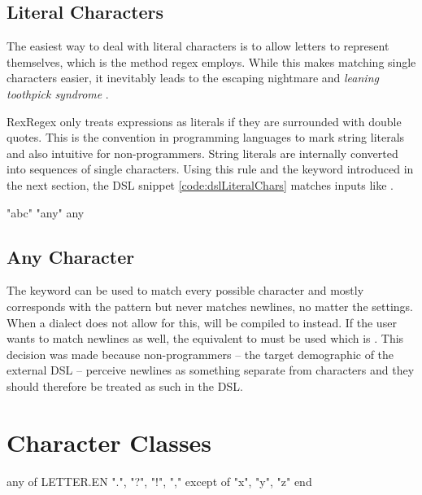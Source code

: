\subsection{Literal Characters}

The easiest way to deal with literal characters is to allow letters to represent themselves, which is the method regex employs. While this makes matching single characters easier, it inevitably leads to the escaping nightmare and \emph{leaning toothpick syndrome} \cite{LeaningToothpick}. 

RexRegex only treats expressions as literals if they are surrounded with double quotes. This is the convention in programming languages to mark string literals and also intuitive for non-programmers. String literals are internally converted into sequences of single characters. Using this rule and the  keyword introduced in the next section, the DSL snippet \ref{code:dslLiteralChars} matches inputs like .

\vspace{5mm}
\begin{rexregexBox}[title={Literal characters in External DSL},label=code:dslLiteralChars,width=10cm,center]
"abc"
"any"
any
\end{rexregexBox}

\subsection{Any Character}

The  keyword can be used to match every possible character and mostly corresponds with the  pattern but never matches newlines, no matter the settings. When a dialect does not allow for this,  will be compiled to \pattern{[\caret\bs n]} instead. If the user wants to match newlines as well, the equivalent to  must be used which is . This decision was made because non-programmers -- the target demographic of the external DSL -- perceive newlines as something separate from characters and they should therefore be treated as such in the DSL.

\section{Character Classes} \label{sec:dslCharClasses}

\begin{rexregexBox}[label=code:dslCharClasses,title=Character classes,width=10cm,center]
any of
    LETTER.EN
    ".", "?", "!", ","
except of
    "x", "y", "z"
end
\end{rexregexBox}

